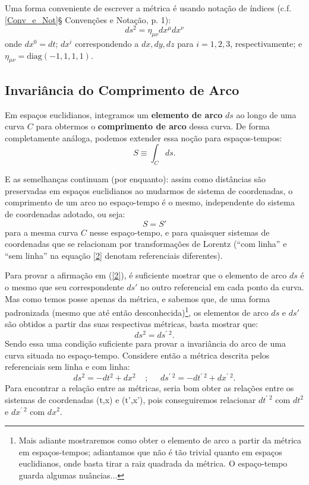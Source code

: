 \documentclass[12pt,a4paper]{article}
\begin{document}
Uma forma conveniente de escrever a métrica é usando notação de índices (c.f. \ref{Conv_e_Not}{§ Convenções e Notação}, p. 1):
\begin{equation*}
  ds^2 = \eta_{\mu\nu}dx^{\mu}dx^{\nu}
\end{equation*}
onde $dx^0 = dt$; $dx^i$ correspondendo a $dx,dy,dz$ para $i=1, 2, 3$, respectivamente; e $\eta_{\mu\nu} = \text{diag}(-1,1,1,1)$.

\subsection{Invariância do Comprimento de Arco}

Em espaços euclidianos, integramos um \textbf{elemento de arco} $ds$
ao longo de uma curva $C$ para obtermos o \textbf{comprimento de arco} dessa curva. De forma completamente análoga,
podemos extender essa noção para espaços-tempos:
\begin{equation}
  S \equiv \int_{C} ds .
\end{equation}

E as semelhanças continuam (por enquanto): assim como distâncias são preservadas em espaços euclidianos ao mudarmos de sistema de coordenadas, o comprimento
de um arco no espaço-tempo é o mesmo, independente do sistema de coordenadas adotado, ou seja:
\begin{equation}
  S = S' 
  \label{2}
\end{equation}
para a mesma curva $C$ nesse espaço-tempo, e para quaisquer sistemas de coordenadas que se relacionam por
transformações de Lorentz (\enquote{com linha} e \enquote{sem linha} na equação \ref{2} denotam referenciais diferentes). 

Para provar a afirmação em (\ref{2}), é suficiente mostrar que o elemento
de arco $ds$ é o mesmo que seu correspondente $ds'$ no outro referencial em cada ponto da curva. Mas como temos posse apenas da métrica,
e sabemos que, de uma forma padronizada (mesmo que até então desconhecida)\footnote{Mais adiante mostraremos como obter o elemento de arco a partir da métrica em espaços-tempos;
adiantamos que não é tão trivial quanto em espaços euclidianos, onde basta tirar a raiz quadrada da
métrica. O espaço-tempo guarda algumas nuâncias...}, os elementos de arco $ds$ e $ds'$ são obtidos a
partir das suas respectivas métricas, basta mostrar que:
\begin{equation*}
  ds^2 = ds^{\prime \; 2}.
\end{equation*}
Sendo essa uma condição suficiente para provar a invariância do arco de uma curva situada no
espaço-tempo. 
Considere então a métrica descrita pelos referenciais sem linha e com linha:
\begin{equation}
  ds^2 = -dt^2 + dx^2 \;\;\;\;;\;\;\;\;\; ds^{\prime\; 2} = -dt^{\prime\; 2} + dx^{\prime\; 2}.
  \label{3}
\end{equation}
Para encontrar a relação entre as métricas, seria bom obter as relações entre os sistemas de coordenadas (t,x) e (t',x'),
pois conseguiremos relacionar $dt^{\prime \; 2}$ com $dt^2$ e $dx^{\prime \; 2}$ com $dx^2$.
\end{document}
